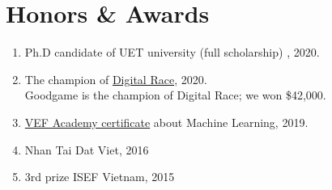 \documentclass[12pt]{article}
\begin{document}
\section{Honors \& Awards}
\begin{enumerate}

\item Ph.D candidate of UET university (full scholarship) , 2020.

\item The champion of \href{https://www.youtube.com/watch?v=nrzcqZVYOZE&t=194s}{Digital Race}, 2020. \\
    Goodgame is the champion of Digital Race; we won \$42,000.

\item \href{https://drive.google.com/file/d/1iXKCnAM39T3kItMZ2s3miEiHPQIM86nM/view?usp=sharing}{VEF Academy certificate} about Machine Learning, 2019.

\item Nhan Tai Dat Viet, 2016
\item 3rd prize ISEF Vietnam, 2015

\end{enumerate}
\end{document}
